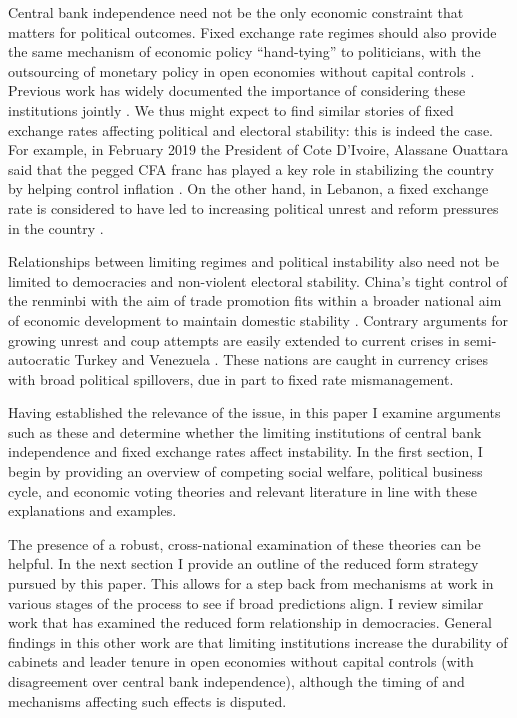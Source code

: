 \documentclass{article}
\begin{document}
    Central bank independence need not be the only economic constraint that matters for political outcomes. Fixed exchange rate regimes should also provide the same mechanism of economic policy “hand-tying” to politicians, with the outsourcing of monetary policy in open economies without capital controls \citep{fleming_domestic_1962, mundell_capital_1963}. Previous work has widely documented the importance of considering these institutions jointly \citep{bernhard_political_2002}. We thus might expect to find similar stories of fixed exchange rates affecting political and electoral stability: this is indeed the case. For example, in February 2019 the President of Cote D’Ivoire, Alassane Ouattara said that the pegged CFA franc has played a key role in stabilizing the country by helping control inflation \citep{bassompierre_ivorian_2019}. On the other hand, in Lebanon, a fixed exchange rate is considered to have led to increasing political unrest and reform pressures in the country \citep{diwan_lebanons_2020}.

    Relationships between limiting regimes and political instability also need not be limited to democracies and non-violent electoral stability. China’s tight control of the renminbi with the aim of trade promotion fits within a broader national aim of economic development to maintain domestic stability \citep{kroeber_renminbi_2011}. Contrary arguments for growing unrest and coup attempts are easily extended to current crises in semi-autocratic Turkey \citep{taner_turkish_2019} and Venezuela \citep{armas_venezuela_2019}. These nations are caught in currency crises with broad political spillovers, due in part to fixed rate mismanagement.

    Having established the relevance of the issue, in this paper I examine arguments such as these and determine whether the limiting institutions of central bank independence and fixed exchange rates affect instability. In the first section, I begin by providing an overview of competing social welfare, political business cycle, and economic voting theories and relevant literature in line with these explanations and examples.

    The presence of a robust, cross-national examination of these theories can be helpful. In the next section I provide an outline of the reduced form strategy pursued by this paper. This allows for a step back from mechanisms at work in various stages of the process to see if broad predictions align. I review similar work that has examined the reduced form relationship in democracies. General findings in this other work are that limiting institutions increase the durability of cabinets and leader tenure in open economies without capital controls (with disagreement over central bank independence), although the timing of and mechanisms affecting such effects is disputed.
\end{document}
